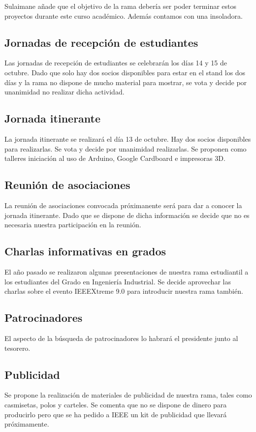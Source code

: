 \documentclass[12pt,twoside,openany,a4paper]{book}
\begin{document}
    Sulaimane añade que el objetivo de la rama debería ser poder terminar estos proyectos durante este curso académico. Además contamos con una insoladora.


    \subsection{Jornadas de recepción de estudiantes}
    Las jornadas de recepción de estudiantes se celebrarán los días 14 y 15 de octubre. Dado que solo hay dos socios disponibles para estar en el stand los dos días y la rama no dispone de mucho material para mostrar, se vota y decide por unanimidad no realizar dicha actividad.


    \subsection{Jornada itinerante}
    La jornada itinerante se realizará el día 13 de octubre. Hay dos socios disponibles para realizarlas. Se vota y decide por unanimidad realizarlas. Se proponen como talleres iniciación al uso de Arduino, Google Cardboard e impresoras 3D.


    \subsection{Reunión de asociaciones}
    La reunión de asociaciones convocada próximanente será para dar a conocer la jornada itinerante. Dado que se dispone de dicha información se decide que no es necesaria nuestra participación en la reunión.


    \subsection{Charlas informativas en grados}
    El año pasado se realizaron algunas presentaciones de nuestra rama estudiantil a los estudiantes del Grado en Ingeniería Industrial. Se decide aprovechar las charlas sobre el evento IEEEXtreme 9.0 para introducir nuestra rama también.


    \subsection{Patrocinadores}
    El aspecto de la búsqueda de patrocinadores lo habrará el presidente junto al tesorero.


    \subsection{Publicidad}
    Se propone la realización de materiales de publicidad de nuestra rama, tales como casmisetas, polos y carteles. Se comenta que no se dispone de dinero para producirlo pero que se ha pedido a IEEE un kit de publicidad que llevará próximamente.
\end{document}

